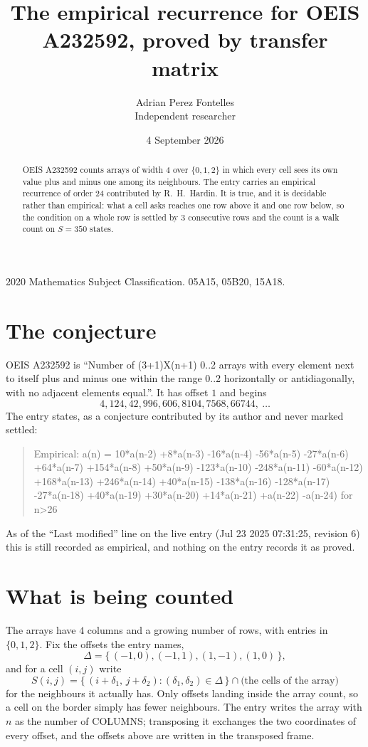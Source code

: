 \documentclass[11pt,a4paper]{article}
\title{The empirical recurrence for OEIS A232592, proved by transfer matrix}
\author{Adrian Perez Fontelles\\ \small Independent researcher}
\date{4 September 2026}
\theoremstyle{plain}
\theoremstyle{definition}
\begin{document}
\maketitle

\begin{abstract}
OEIS A232592 counts arrays of width $4$ over $\{0,1,2\}$ in which every cell sees its own value plus and minus one among its neighbours. The entry carries an
empirical recurrence of order $24$ contributed by R.~H.~Hardin. It is true, and it is
decidable rather than empirical: what a cell asks reaches one row above it and one row below, so the
condition on a whole row is settled by $3$ consecutive rows and the count is a walk
count on $S=350$ states.
\end{abstract}

\noindent\small 2020 Mathematics Subject Classification. 05A15, 05B20, 15A18.\normalsize

\section{The conjecture}

OEIS A232592 is ``Number of (3+1)X(n+1) 0..2 arrays with every element next to itself plus and minus one within the range 0..2 horizontally or antidiagonally, with no adjacent elements equal.''. It has offset $1$ and begins
\[
4, 124, 42, 996, 606, 8104, 7568, 66744,\ \dots
\]
The entry states, as a conjecture contributed by its author and never marked settled:
\begin{quote}
Empirical: a(n) = 10*a(n-2) +8*a(n-3) -16*a(n-4) -56*a(n-5) -27*a(n-6) +64*a(n-7) +154*a(n-8) +50*a(n-9) -123*a(n-10) -248*a(n-11) -60*a(n-12) +168*a(n-13) +246*a(n-14) +40*a(n-15) -138*a(n-16) -128*a(n-17) -27*a(n-18) +40*a(n-19) +30*a(n-20) +14*a(n-21) +a(n-22) -a(n-24) for n>26
\end{quote}
As of the ``Last modified'' line on the live entry (Jul 23 2025 07:31:25, revision 6) this is still
recorded as empirical, and nothing on the entry records it as proved.

\section{What is being counted}

The arrays have $4$ columns and a growing number of rows, with entries in $\{0,1,2\}$. Fix the
offsets the entry names,
\[
\Delta=\{\,(-1,0), (-1,1), (1,-1), (1,0)\,\},
\]
and for a cell $(i,j)$ write
\[
S(i,j)=\{\,(i+\delta_1,\,j+\delta_2) : (\delta_1,\delta_2)\in\Delta\,\}\cap
\text{(the cells of the array)}
\]
for the neighbours it actually has. Only offsets landing inside the array count, so a cell on
the border simply has fewer neighbours. The entry writes the array with $n$ as the number of COLUMNS; transposing it exchanges the two coordinates of every offset, and the offsets above are written in the transposed frame.
\end{document}
